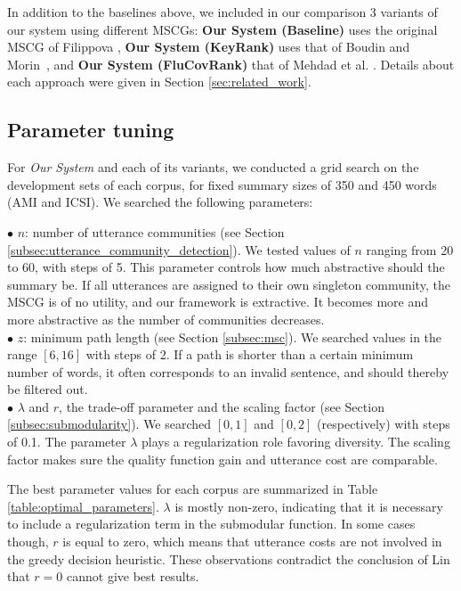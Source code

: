 \documentclass[11pt,a4paper]{article}
\begin{document}
In addition to the baselines above, we included in our comparison 3 variants of our system using different MSCGs: \textbf{Our System (Baseline)} uses the original MSCG of Filippova , \textbf{Our System (KeyRank)} uses that of Boudin and Morin~, and \textbf{Our System (FluCovRank)} that of Mehdad et al. . Details about each approach were given in Section \ref{sec:related_work}.

\subsection{Parameter tuning}
For \textit{Our System} and each of its variants, we conducted a grid search on the development sets of each corpus, for fixed summary sizes of 350 and 450 words (AMI and ICSI). We searched the following parameters:

\noindent $\bullet$ $n$: number of utterance communities (see Section \ref{subsec:utterance_community_detection}). We tested values of $n$ ranging from 20 to 60, with steps of 5. This parameter controls how much abstractive should the summary be. If all utterances are assigned to their own singleton community, the MSCG is of no utility, and our framework is extractive. It becomes more and more abstractive as the number of communities decreases. \\
$\bullet$ $z$: minimum path length (see Section \ref{subsec:msc}). We searched values in the range $[6,16]$ with steps of 2. If a path is shorter than a certain minimum number of words, it often corresponds to an invalid sentence, and should thereby be filtered out. \\
$\bullet$ $\lambda$ and $r$, the trade-off parameter and the scaling factor (see Section \ref{subsec:submodularity}). We searched $[0, 1]$ and $[0, 2]$ (respectively) with steps of 0.1. The parameter $\lambda$ plays a regularization role favoring diversity. The scaling factor makes sure the quality function gain and utterance cost are comparable.

The best parameter values for each corpus are summarized in Table \ref{table:optimal_parameters}. $\lambda$ is mostly non-zero, indicating  that it is necessary to include a regularization term in the submodular function. In some cases though, $r$ is equal to zero, which means that utterance costs are not involved in the greedy decision heuristic. These observations contradict the conclusion of Lin  that $r=0$ cannot give best results.
\end{document}
